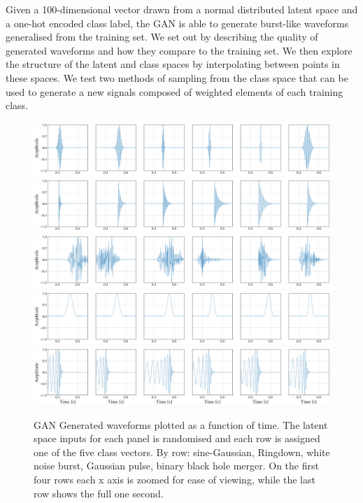 \documentclass[12pt]{iopart}
\begin{document}
%
Given a 100-dimensional vector drawn from a normal distributed latent space and a one-hot encoded class
label, the GAN is able to generate burst-like waveforms generalised from the
training set. We set out by describing the quality of generated waveforms and
how they compare to the training set. We then explore the structure of the
latent and class spaces by interpolating between points in these spaces. We
test two methods of sampling from the class space that can be used to generate
a new signals composed of weighted elements of each training class.
\begin{figure}[!h]
    \centering
    \includegraphics[width=\textwidth]{figures/generations/sg.png}
    \includegraphics[width=\textwidth]{figures/generations/rd.png}
    \includegraphics[width=\textwidth]{figures/generations/wnb.png}
    \includegraphics[width=\textwidth]{figures/generations/blip.png}
    \includegraphics[width=\textwidth]{figures/generations/bbh.png}
    \caption{\ac{GAN} Generated waveforms plotted as a function of time. The latent space inputs for each panel is randomised and each row is assigned one of the five class vectors. By row: sine-Gaussian, Ringdown,
white noise burst, Gaussian pulse, binary black hole merger. On the first four rows each x axis is zoomed for ease of viewing, while the last row shows the full one second.}
\label{fig:gen_signals} 
\end{figure}
\end{document}
